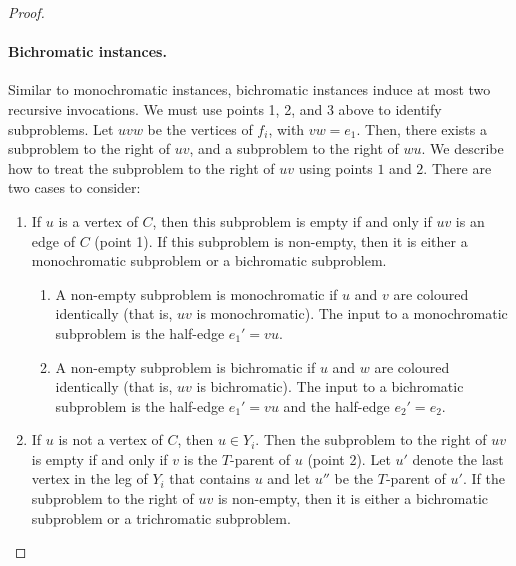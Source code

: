 \documentclass{patmorin}
\begin{document}
\begin{proof}
\paragraph{Bichromatic instances.} %
Similar to monochromatic instances, bichromatic instances induce at most two recursive invocations. We must use points 1, 2, and 3 above to identify subproblems. Let $uvw$ be the vertices of $f_i$, with $vw = e_1$. Then, there exists a subproblem to the right of $uv$, and a subproblem to the right of $wu$.  We describe how to treat the subproblem to the right of $uv$ using points $1$ and $2$.  There are two cases to consider:

\begin{enumerate}
  \item If $u$ is a vertex of $C$, then this subproblem is empty if and only if $uv$ is an edge of $C$ (point 1). If this subproblem is non-empty, then it is either a monochromatic subproblem or a bichromatic subproblem.
  
  \begin{enumerate}
  \item A non-empty subproblem is monochromatic if $u$ and $v$ are coloured identically (that is, $uv$ is monochromatic). The input to a monochromatic subproblem is the half-edge $e_1'=vu$.
  
  \item A non-empty subproblem is bichromatic if $u$ and $w$ are coloured identically (that is, $uv$ is bichromatic). The input to a bichromatic subproblem is the half-edge $e_1'=vu$ and the half-edge $e_2'=e_2$.
\end{enumerate}

  \item If $u$ is not a vertex of $C$, then $u\in Y_i$.  Then the subproblem to the right of $uv$ is empty if and only if $v$ is the $T$-parent of $u$ (point 2).  Let $u'$ denote the last vertex in the leg of $Y_i$ that contains $u$ and let $u''$ be the $T$-parent of $u'$.  If the subproblem to the right of $uv$ is non-empty, then it is either a bichromatic subproblem or a trichromatic subproblem.
  

\end{enumerate}
\end{proof}
\end{document}
